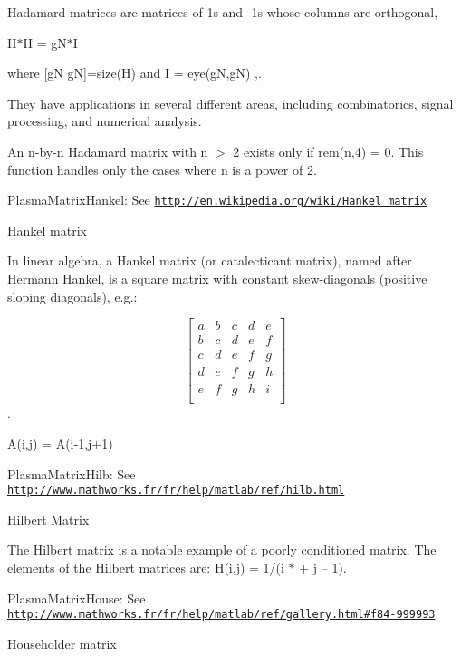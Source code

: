 Hadamard matrices are matrices of 1\textquotesingle{}s and -\/1\textquotesingle{}s whose columns are orthogonal,

H\textquotesingle{}$\ast$\+H = g\+N$\ast$\+I

where \mbox{[}g\+N g\+N\mbox{]}=size(\+H) and I = eye(g\+N,g\+N) ,.

They have applications in several different areas, including combinatorics, signal processing, and numerical analysis.

An n-\/by-\/n Hadamard matrix with n $>$ 2 exists only if rem(n,4) = 0. This function handles only the cases where n is a power of 2.

\begin{DoxyItemize}
\item Plasma\+Matrix\+Hankel\+: See \href{http://en.wikipedia.org/wiki/Hankel_matrix}{\tt http\+://en.\+wikipedia.\+org/wiki/\+Hankel\+\_\+matrix}\end{DoxyItemize}
Hankel matrix

In linear algebra, a Hankel matrix (or catalecticant matrix), named after Hermann Hankel, is a square matrix with constant skew-\/diagonals (positive sloping diagonals), e.\+g.\+:

\[ \begin{bmatrix} a & b & c & d & e \\ b & c & d & e & f \\ c & d & e & f & g \\ d & e & f & g & h \\ e & f & g & h & i \\ \end{bmatrix} \].

A(i,j) = A(i-\/1,j+1)

\begin{DoxyItemize}
\item Plasma\+Matrix\+Hilb\+: See \href{http://www.mathworks.fr/fr/help/matlab/ref/hilb.html}{\tt http\+://www.\+mathworks.\+fr/fr/help/matlab/ref/hilb.\+html}\end{DoxyItemize}
Hilbert Matrix

The Hilbert matrix is a notable example of a poorly conditioned matrix. The elements of the Hilbert matrices are\+: H(i,j) = 1/(i $\ast$ + j – 1).

\begin{DoxyItemize}
\item Plasma\+Matrix\+House\+: See \href{http://www.mathworks.fr/fr/help/matlab/ref/gallery.html#f84-999993}{\tt http\+://www.\+mathworks.\+fr/fr/help/matlab/ref/gallery.\+html\#f84-\/999993}\end{DoxyItemize}
Householder matrix

